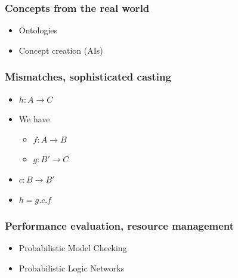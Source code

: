 \documentclass[aspectratio=169]{beamer}
\begin{document}
\begin{frame}
  \frametitle{Concepts from the real world}
  \begin{itemize}
  \item Ontologies
  \item Concept creation (AIs)
  \end{itemize}
\end{frame}

\begin{frame}
  \frametitle{Mismatches, sophisticated casting}
  \begin{itemize}
  \item<+-> $h : A \rightarrow C$
  \item<+-> We have 
    \begin{itemize}
    \item $f : A \rightarrow B$
    \item $g : B' \rightarrow C$
    \end{itemize}
  \item<+-> $c : B \rightarrow B'$
  \item<+-> $h = g . c . f$
  \end{itemize}
\end{frame}

\begin{frame}
  \frametitle{Performance evaluation, resource management}
  \begin{itemize}
  \item Probabilistic Model Checking
  \item Probabilistic Logic Networks
  \end{itemize}
\end{frame}

\end{document}
